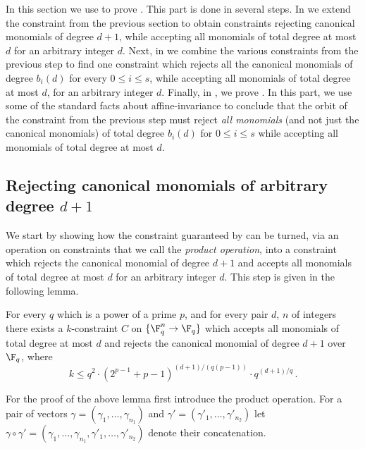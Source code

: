 In this section we use 
to prove
.
This part is done in several steps.
In 
we extend the constraint from the previous section
to obtain constraints rejecting
canonical monomials of degree $d+1$, while accepting all monomials of total degree at most $d$ for an arbitrary integer $d$.
Next, in  we combine the various constraints from the previous
step to find one constraint which rejects all the canonical
monomials of degree $b_i(d)$ for every $0\leq i\leq s$, while accepting all
monomials of total degree at most $d$, for an arbitrary integer $d$. Finally, in , we
prove . In this part, we use
some of the standard facts about affine-invariance to conclude that
the orbit of the constraint from the previous step must reject \emph{all monomials} (and not just the canonical monomials) of total degree $b_i(d)$ for $0\leq i\leq s$ while accepting all monomials of total degree at most $d$.
%
%

\subsection{Rejecting canonical monomials of arbitrary degree
  \texorpdfstring{$d +1$}{d + 1}}
\label{ssec:arbit degree}

We start by showing how the constraint guaranteed by
 can be turned, via an operation on
 constraints that we call the \emph{product operation},
 into a constraint which rejects the canonical monomial of degree $d+1$ and accepts all monomials of total degree at most $d$ for an arbitrary integer $d$. This step is given in the following lemma.

\begin{lemma}\label{lem:arbitrary-degree}
For every  $q$ which is a power of a prime $p$, and 
%
for every pair $d$, $n$ of integers %
there exists a $k$-constraint $C$
on $\{\F_q^n \to \F_q\}$ which accepts all monomials
of total degree at most $d$
and rejects the canonical monomial
of degree $d+1$
over $\F_q$, where  \[k \leq q^2 \cdot
\left(2^{p-1}+p-1\right)^{(d+1)/(q(p-1))}
\cdot q^{(d+1)/q}\,.\]
\end{lemma}

For the proof of the above lemma first introduce the product operation. For a pair of vectors $\gamma=(\gamma_1,\ldots,\gamma_{n_1})$ and $\gamma'=(\gamma'_1,\ldots,\gamma'_{n_2})$ let $\gamma \circ \gamma'=
(\gamma_1,\ldots,\gamma_{n_1},\gamma'_1,\ldots,\gamma'_{n_2})$ denote their concatenation.


